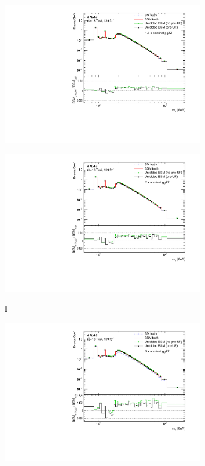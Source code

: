 \begin{figure}[h!]
    \begin{subfigure}{.43\textwidth}\centering\includegraphics[width = 0.95\textwidth]{Figures/m4l/InjectionTests/1dot5xggllll_injection.pdf}\caption{}\label{fig:injection_0dot4032fb_1400w15}\end{subfigure}
    \begin{subfigure}{.43\textwidth}\centering\includegraphics[width = 0.95\textwidth]{Figures/m4l/InjectionTests/2xggllll_injection.pdf}\caption{}l\label{fig:injection_1dot24fb_300NW}\end{subfigure}
    \begin{subfigure}{.43\textwidth}\centering\includegraphics[width = 0.95\textwidth]{Figures/m4l/InjectionTests/5xggllll_injection.pdf}\caption{}\end{subfigure}

\end{figure}
